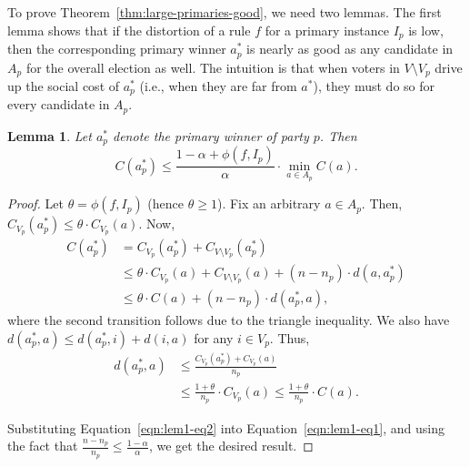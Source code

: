 \documentclass[letterpaper]{article} %
\newtheorem{lemma}[theorem]{Lemma}
\theoremstyle{definition}
\begin{document}
To prove Theorem~\ref{thm:large-primaries-good}, we need two lemmas. The first lemma shows that if the distortion of a rule $f$ for a primary instance $I_p$ is low, then the corresponding primary winner $a^*_p$ is nearly as good as any candidate in $A_p$ for the overall election as well. The intuition is that when voters in $V \setminus V_p$ drive up the social cost of $a^*_p$ (i.e., when they are far from $a^*$), they must do so for every candidate in $A_p$.

\begin{lemma}
\label{lem:winner-opt-same-party}
	Let $a^*_p$ denote the primary winner of party $p$. Then
	$$
	C(a^*_p) \le \frac{1-\alpha+\phi(f,I_p)}{\alpha} \cdot \min_{a \in A_p} C(a).
	$$
\end{lemma}
\begin{proof}
	Let $\theta = \phi(f,I_p)$ (hence $\theta\geq 1$). Fix an arbitrary $a \in A_p$. Then, $C_{V_p}(a^*_p) \le \theta \cdot C_{V_p}(a)$. %
	Now,
	\begin{align}
	C(a^*_p) &= C_{V_p}(a^*_p) + C_{V\setminus V_{p}}(a^*_p) \nonumber\\
	&\le \theta\cdot C_{V_p}(a) + C_{V\setminus V_{p}}(a) +(n-n_{p}) \cdot d(a,a^*_p) \nonumber\\
	&\le \theta \cdot C(a) + (n-n_{p}) \cdot d(a^*_p,a),
	\label{eqn:lem1-eq1}
	\end{align}
	where the second transition follows %
	due to the triangle inequality.
	We also have $d(a^*_p,a) \le d(a^*_p,i)+d(i,a)$ for any $i \in V_p$. Thus,
	\begin{align}
	d(a^*_p,a) &\le \frac{C_{V_p}(a^*_p)+C_{V_p}(a)}{n_p} \nonumber\\
	&\le \frac{1+\theta}{n_p} \cdot C_{V_p}(a) \le \frac{1+\theta}{n_p} \cdot C(a).
	\label{eqn:lem1-eq2}
	\end{align}

	Substituting Equation~\eqref{eqn:lem1-eq2} into Equation~\eqref{eqn:lem1-eq1}, and using the fact that $\frac{n-n_{p}}{n_p} \le \frac{1-\alpha}{\alpha}$, we get the desired result.
\end{proof}
\end{document}
